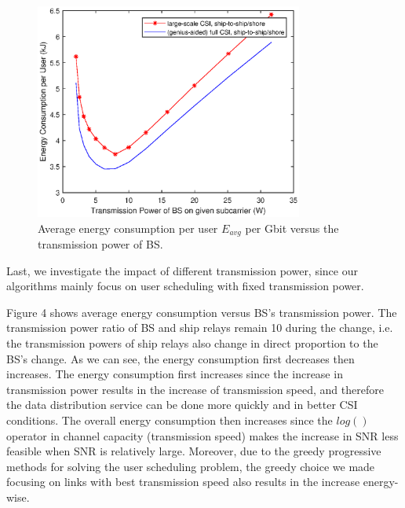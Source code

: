 \documentclass[conference]{IEEEtran}
\begin{document}
 \begin{figure} [htb]
 \begin{center}
 \includegraphics*[width=8.8cm]{snrs.eps}
 \end{center}
 \vspace*{-4mm} 
 \caption{Average energy consumption per user $E_{avg}$ per Gbit versus the transmission power of BS.}\label{fig:5}
 \vspace*{-2mm} 
 \end{figure}
 
 Last, we investigate the impact of different transmission power, since our algorithms mainly focus on user scheduling with fixed transmission power. 
 
 Figure 4 shows average energy consumption versus BS's transmission power. The transmission power ratio of BS and ship relays remain 10 during the change, i.e. the transmission powers of ship relays also change in direct proportion to the BS's change. 
 As we can see, the energy consumption first decreases then increases. 
 The energy consumption first increases since the increase in transmission power results in the increase of transmission speed, and therefore the data distribution service can be done more quickly and in better CSI conditions. 
 The overall energy consumption then increases since the $log\left({}\right)$ operator in channel capacity (transmission speed) makes the increase in SNR less feasible when SNR is relatively large. Moreover, due to the greedy progressive methods for solving the user scheduling problem, the greedy choice we made focusing on links with best transmission speed also results in the increase energy-wise. 
 
\end{document}
